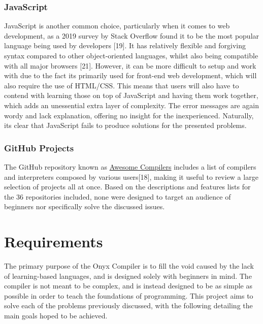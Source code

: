 \documentclass[
]{report}
\begin{document}
\subsection{JavaScript}
JavaScript is another common choice, particularly when it comes to web
development, as a 2019 survey by Stack Overflow found it to be the most
popular language being used by developers {[}19{]}. It has relatively
flexible and forgiving syntax compared to other object-oriented
languages, whilst also being compatible with all major browsers
{[}21{]}. However, it can be more difficult to setup and work with due
to the fact its primarily used for front-end web development, which will
also require the use of HTML/CSS. This means that users will also have
to contend with learning those on top of JavaScript and having them work
together, which adds an unessential extra layer of complexity. The error
messages are again wordy and lack explanation, offering no insight for
the inexperienced. Naturally, its clear that JavaScript fails to produce
solutions for the presented problems.

\subsection{GitHub Projects}
The GitHub repository known as
\href{https://github.com/rsumner31/awesome-compilers}{Awesome Compilers}
includes a list of compilers and interpreters composed by various
users{[}18{]}, making it useful to review a large selection of projects
all at once. Based on the descriptions and features lists for the 36
repositories included, none were designed to target an audience of
beginners nor specifically solve the discussed issues.

\chapter{Requirements}
The primary purpose of the Onyx Compiler is to fill the void caused by
the lack of learning-based languages, and is designed solely with
beginners in mind. The compiler is not meant to be complex, and is
instead designed to be as simple as possible in order to teach the
foundations of programming. This project aims to solve each of the
problems previously discussed, with the following detailing the main
goals hoped to be achieved.
\end{document}
